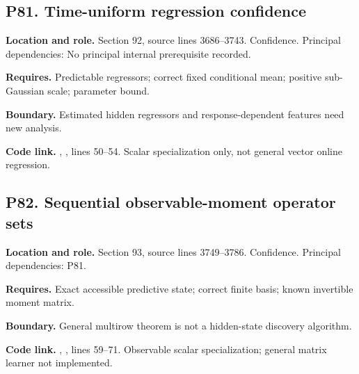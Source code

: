 \documentclass[11pt,letterpaper]{article}
\begin{document}
\par\noindent\begin{minipage}{\textwidth}
\subsection{P81. Time-uniform regression
confidence}\label{p81.-time-uniform-regression-confidence}

\textbf{Location and role.} Section 92, source lines 3686--3743.
Confidence. Principal dependencies: No principal internal prerequisite
recorded.

\textbf{Requires.} Predictable regressors; correct fixed conditional
mean; positive sub-Gaussian scale; parameter bound.

\textbf{Boundary.} Estimated hidden regressors and response-dependent
features need new analysis.

\textbf{Code link.} ,
, lines 50--54. Scalar specialization only, not general
vector online regression.
\end{minipage}\par\medskip

\par\noindent\begin{minipage}{\textwidth}
\subsection{P82. Sequential observable-moment operator
sets}\label{p82.-sequential-observable-moment-operator-sets}

\textbf{Location and role.} Section 93, source lines 3749--3786.
Confidence. Principal dependencies: P81.

\textbf{Requires.} Exact accessible predictive state; correct finite
basis; known invertible moment matrix.

\textbf{Boundary.} General multirow theorem is not a hidden-state
discovery algorithm.

\textbf{Code link.} ,
, lines 59--71. Observable scalar
specialization; general matrix learner not implemented.
\end{minipage}\par\medskip
\end{document}

